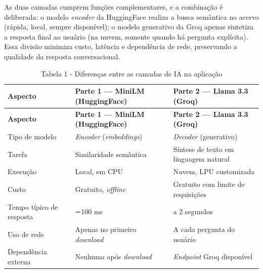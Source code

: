 \documentclass[
]{article}
\begin{document}
As duas camadas cumprem funções complementares, e a combinação é
deliberada: o modelo \emph{encoder} da HuggingFace realiza a busca
semântica no acervo (rápida, local, sempre disponível); o modelo
generativo da Groq apenas sintetiza a resposta final ao usuário (na
nuvem, somente quando há pergunta explícita). Essa divisão minimiza
custo, latência e dependência de rede, preservando a qualidade da
resposta conversacional.

\begin{longtable}[]{@{}
  >{\centering\arraybackslash}p{}
  >{\centering\arraybackslash}p{}
  >{\centering\arraybackslash}p{}@{}}
\caption{Tabela 1 - Diferenças entre as camadas de IA na
aplicação}\tabularnewline
\toprule\noalign{}
\begin{minipage}[b]{\linewidth}\centering
\textbf{Aspecto}
\end{minipage} & \begin{minipage}[b]{\linewidth}\centering
\textbf{Parte 1 --- MiniLM (HuggingFace)}
\end{minipage} & \begin{minipage}[b]{\linewidth}\centering
\textbf{Parte 2 --- Llama 3.3 (Groq)}
\end{minipage} \\
\midrule\noalign{}
\endfirsthead
\toprule\noalign{}
\begin{minipage}[b]{\linewidth}\centering
\textbf{Aspecto}
\end{minipage} & \begin{minipage}[b]{\linewidth}\centering
\textbf{Parte 1 --- MiniLM (HuggingFace)}
\end{minipage} & \begin{minipage}[b]{\linewidth}\centering
\textbf{Parte 2 --- Llama 3.3 (Groq)}
\end{minipage} \\
\midrule\noalign{}
\endhead
\bottomrule\noalign{}
\endlastfoot
Tipo de modelo & \emph{Encoder} (\emph{embeddings}) & \emph{Decoder}
(generativo) \\
Tarefa & Similaridade semântica & Síntese de texto em linguagem
natural \\
Execução & Local, em CPU & Nuvem, LPU customizada \\
Custo & Gratuito, \emph{offline} & Gratuito com limite de requisições \\
Tempo típico de resposta & ∼100 ms & 1 a 2 segundos \\
Uso de rede & Apenas no primeiro \emph{download} & A cada pergunta do
usuário \\
Dependência externa & Nenhuma após \emph{download} & \emph{Endpoint}
Groq disponível \\
\end{longtable}
\end{document}
